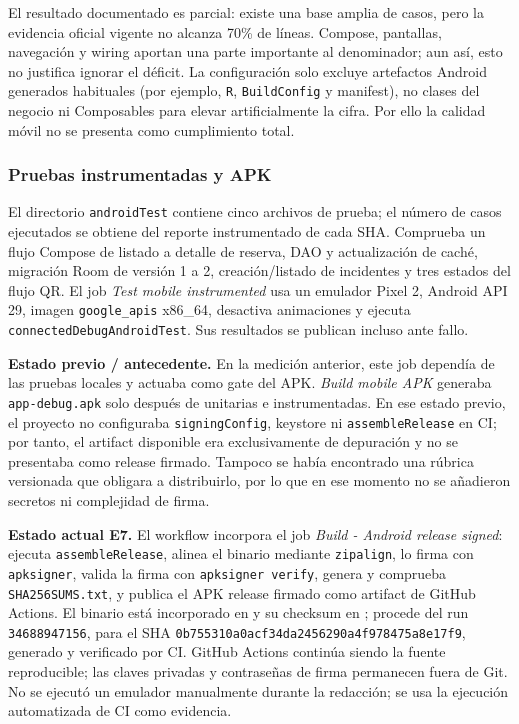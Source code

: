 El resultado documentado es parcial: existe una base amplia de casos, pero la
evidencia oficial vigente no alcanza 70\% de líneas. Compose, pantallas,
navegación y wiring
aportan una parte importante al denominador; aun así, esto no justifica ignorar
el déficit. La configuración solo excluye artefactos Android generados habituales
(por ejemplo, \texttt{R}, \texttt{BuildConfig} y manifest), no clases del
negocio ni Composables para elevar artificialmente la cifra. Por ello la calidad
móvil no se presenta como cumplimiento total.

\subsubsection{Pruebas instrumentadas y APK}

El directorio \texttt{androidTest} contiene cinco archivos de prueba; el número
de casos ejecutados se obtiene del reporte instrumentado de cada SHA.
Comprueba un flujo Compose de listado a detalle de reserva, DAO y actualización
de caché, migración Room de versión 1 a 2, creación/listado de incidentes y tres
estados del flujo QR. El job \emph{Test mobile instrumented} usa un emulador
Pixel 2, Android API 29, imagen \texttt{google\_apis} x86\_64, desactiva
animaciones y ejecuta \texttt{connectedDebugAndroidTest}. Sus resultados se
publican incluso ante fallo.

\textbf{Estado previo / antecedente.} En la medición anterior, este job dependía
de las pruebas locales y actuaba como gate del APK. \emph{Build mobile APK}
generaba \texttt{app-debug.apk} solo después de unitarias e instrumentadas. En
ese estado previo, el proyecto no configuraba \texttt{signingConfig}, keystore
ni \texttt{assembleRelease} en CI; por tanto, el artifact disponible era
exclusivamente de depuración y no se presentaba como release firmado. Tampoco se
había encontrado una rúbrica versionada que obligara a distribuirlo, por lo que
en ese momento no se añadieron secretos ni complejidad de firma.

\textbf{Estado actual E7.} El workflow incorpora el job \emph{Build - Android
release signed}: ejecuta \texttt{assembleRelease}, alinea el binario mediante
\texttt{zipalign}, lo firma con \texttt{apksigner}, valida la firma con
\texttt{apksigner verify}, genera y comprueba \texttt{SHA256SUMS.txt}, y publica
el APK release firmado como artifact de GitHub Actions. El binario está
incorporado en  y su checksum en
; procede del run \texttt{34688947156}, para el
SHA \texttt{0b755310a0acf34da2456290a4f978475a8e17f9}, generado y verificado por
CI. GitHub Actions continúa siendo la fuente reproducible; las claves privadas
y contraseñas de firma permanecen fuera de Git.
No se ejecutó un emulador manualmente durante la redacción; se usa la ejecución
automatizada de CI como evidencia.

